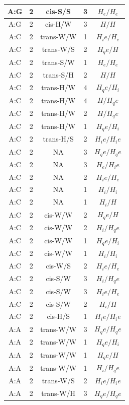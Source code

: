 \begin{center}
\begin{longtable}{c|c|c|c|c}
A:G & 2 & cis-S/S & 3 & $H_e/H_e$ \\  \hline
A:G & 2 & cis-H/W & 3 & $H/H$ \\  \hline
A:C & 2 & trans-W/W & 1 & $H_ie/H_e$ \\  \hline
A:C & 2 & trans-W/S & 2 & $H_qe/H$ \\  \hline
A:C & 2 & trans-S/W & 1 & $H_e/H_e$ \\  \hline
A:C & 2 & trans-S/H & 2 & $H/H$ \\  \hline
A:C & 2 & trans-H/W & 4 & $H_qe/H_i$ \\  \hline
A:C & 2 & trans-H/W & 4 & $H/H_qe$ \\  \hline
A:C & 2 & trans-H/W & 2 & $H/H_qe$ \\  \hline
A:C & 2 & trans-H/W & 1 & $H_qe/H_i$ \\  \hline
A:C & 2 & trans-H/S & 2 & $H_ie/H_ie$ \\  \hline
A:C & 2 & NA & 3 & $H_qe/H_qe$ \\  \hline
A:C & 2 & NA & 3 & $H_e/H_ie$ \\  \hline
A:C & 2 & NA & 2 & $H_ie/H_e$ \\  \hline
A:C & 2 & NA & 1 & $H_i/H_i$ \\  \hline
A:C & 2 & NA & 1 & $H_i/H$ \\  \hline
A:C & 2 & cis-W/W & 2 & $H_qe/H$ \\  \hline
A:C & 2 & cis-W/W & 2 & $H_i/H_qe$ \\  \hline
A:C & 2 & cis-W/W & 1 & $H_qe/H_i$ \\  \hline
A:C & 2 & cis-W/W & 1 & $H_i/H_i$ \\  \hline
A:C & 2 & cis-W/S & 2 & $H_ie/H_e$ \\  \hline
A:C & 2 & cis-S/W & 3 & $H_i/H_qe$ \\  \hline
A:C & 2 & cis-S/W & 3 & $H_ie/H_e$ \\  \hline
A:C & 2 & cis-S/W & 2 & $H_i/H$ \\  \hline
A:C & 2 & cis-H/S & 1 & $H_ie/H_ie$ \\  \hline
A:A & 2 & trans-W/W & 3 & $H_qe/H_qe$ \\  \hline
A:A & 2 & trans-W/W & 1 & $H_qe/H_i$ \\  \hline
A:A & 2 & trans-W/W & 1 & $H_qe/H$ \\  \hline
A:A & 2 & trans-W/W & 1 & $H_i/H_qe$ \\  \hline
A:A & 2 & trans-W/S & 2 & $H_ie/H_ie$ \\  \hline
A:A & 2 & trans-W/H & 3 & $H_qe/H_qe$ \\  \hline

\end{longtable}
\end{center}
